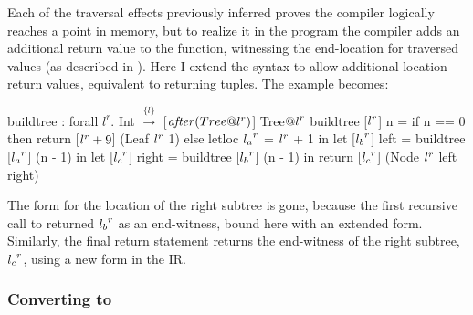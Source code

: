 Each of the traversal effects previously inferred proves the compiler logically reaches a
point in memory, but to realize it in the program the compiler adds an
additional return value to the function, witnessing the end-location for
traversed values (as described in \cite{ecoop17-gibbon}).
%
Here I extend the syntax to allow additional location-return values,
equivalent to returning tuples.  The  example becomes:
%

\begin{code}
buildtree : forall $l^r$. Int $\xrightarrow{\{l\}}$ [$\mathit{after}(Tree @ {l}^{r})$] Tree${@l}^{r}$
buildtree [${l}^{r}$]  n =
  if n == 0 then return [${l}^{r}+9$] (Leaf ${l}^{r}$ 1)
  else letloc ${l_a}^{r}$ = ${l}^{r}$ + 1 in
       let [${l_b}^{r}$] left = buildtree [${l_a}^{r}$] (n - 1) in
       let [${l_c}^{r}$] right = buildtree [${l_b}^{r}$] (n - 1) in
       return [${l_c}^{r}$] (Node ${l}^{r}$ left right)
\end{code}%


The  form for the location of the right subtree is gone, because
the first recursive call to  returned ${l_b}^{r}$ as an end-witness,
bound here with an extended  form.
Similarly, the final return statement returns the end-witness of the right subtree,
${l_c}^{r}$, using a new  form in the IR.

\subsubsection{Converting to \lamcur}
\label{subsubsec:cursorize}


